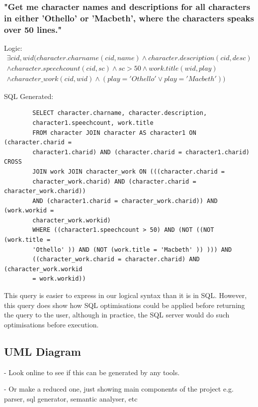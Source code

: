 \documentclass[a4paper, 11pt]{article}
\begin{document}
      \subsubsection*{"Get me character names and descriptions for all
        characters in either 'Othello' or 'Macbeth', where the characters
      speaks over 50 lines."}

      Logic:
      \begin{multline}
        \exists cid,wid(character.charname(cid, name) \land character.description(cid,
        desc) \\
        \land character.speechcount(cid, sc) \land sc > 50 
        \land work.title(wid, play) 
        \\ \land character\_work(cid, wid) \land (play = 'Othello' 
        \lor play = 'Macbeth'))
      \end{multline}

      SQL Generated:
      \begin{verbatim}
        SELECT character.charname, character.description,
        character1.speechcount, work.title
        FROM character JOIN character AS character1 ON (character.charid =
        character1.charid) AND (character.charid = character1.charid) CROSS
        JOIN work JOIN character_work ON (((character.charid =
        character_work.charid) AND (character.charid = character_work.charid))
        AND (character1.charid = character_work.charid)) AND (work.workid =
        character_work.workid)
        WHERE ((character1.speechcount > 50) AND (NOT ((NOT (work.title =
        'Othello' )) AND (NOT (work.title = 'Macbeth' )) ))) AND
        ((character_work.charid = character.charid) AND (character_work.workid
        = work.workid))
      \end{verbatim}

      This query is easier to express in our logical syntax than it is in SQL.
      However, this query does show how SQL optimisations could be applied
      before returning the query to the user, although in practice, the SQL
      server would do such optimisations before execution.

  \subsection{UML Diagram}

  - Look online to see if this can be generated by any tools.

  - Or make a reduced one, just showing main components of the project e.g.
  parser, sql generator, semantic analyser, etc
\end{document}
